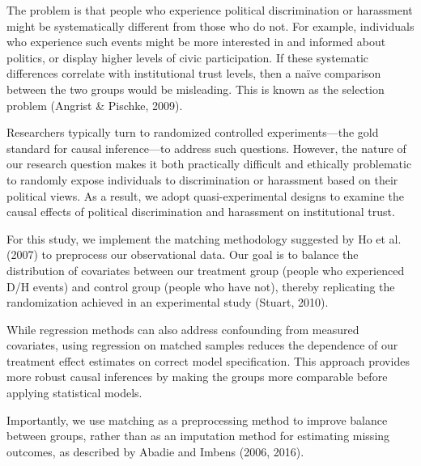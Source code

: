 \documentclass{article}
\begin{document}
The problem is that people who experience political discrimination or harassment might be systematically different from those who do not. For example, individuals who experience such events might be more interested in and informed about politics, or display higher levels of civic participation. If these systematic differences correlate with institutional trust levels, then a naïve comparison between the two groups would be misleading. This is known as the selection problem (Angrist \& Pischke, 2009).

Researchers typically turn to randomized controlled experiments—the gold standard for causal inference—to address such questions. However, the nature of our research question makes it both practically difficult and ethically problematic to randomly expose individuals to discrimination or harassment based on their political views. As a result, we adopt quasi-experimental designs to examine the causal effects of political discrimination and harassment on institutional trust.

For this study, we implement the matching methodology suggested by Ho et al. (2007) to preprocess our observational data. Our goal is to balance the distribution of covariates between our treatment group (people who experienced D/H events) and control group (people who have not), thereby replicating the randomization achieved in an experimental study (Stuart, 2010).

While regression methods can also address confounding from measured covariates, using regression on matched samples reduces the dependence of our treatment effect estimates on correct model specification. This approach provides more robust causal inferences by making the groups more comparable before applying statistical models.

Importantly, we use matching as a preprocessing method to improve balance between groups, rather than as an imputation method for estimating missing outcomes, as described by Abadie and Imbens (2006, 2016).
\end{document}
